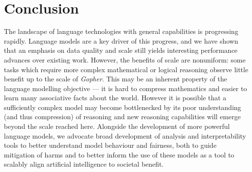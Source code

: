 \section{Conclusion}
The landscape of language technologies with general capabilities is progressing rapidly.  Language models are a key driver of this progress, and we have shown that an emphasis on data quality and scale still yields interesting performance advances over existing work.  However, the benefits of scale are nonuniform: some tasks which require more complex mathematical or logical reasoning observe little benefit up to the scale of \textit{Gopher}. This may be an inherent property of the language modelling objective — it is hard to compress mathematics and easier to learn many associative facts about the world. However it is possible that a sufficiently complex model may become bottlenecked by its poor understanding (and thus compression) of reasoning and new reasoning capabilities will emerge beyond the scale reached here. Alongside the development of more powerful language models, we advocate broad development of analysis and interpretability tools to better understand model behaviour and fairness, both to guide mitigation of harms and to better inform the use of these models as a tool to scalably align artificial intelligence to societal benefit.


